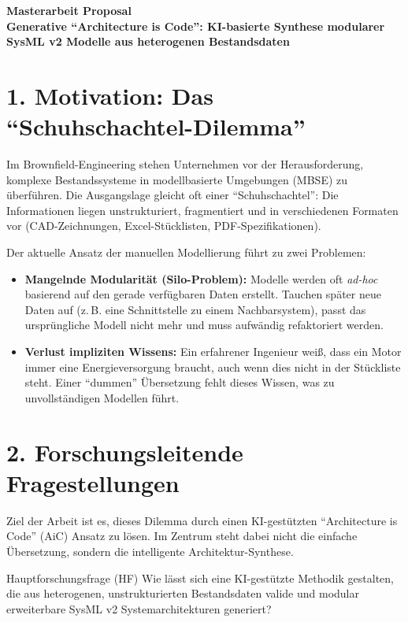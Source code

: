 \documentclass[a4paper,11pt]{article}
\begin{document}
\begin{center}
    {\LARGE \textbf{Masterarbeit Proposal}}\\[0.8em]
    {\Large \textbf{Generative \enquote{Architecture is Code}: KI-basierte Synthese modularer SysML v2 Modelle aus heterogenen Bestandsdaten}}\\[2em]
\end{center}

\section{1. Motivation: Das \enquote{Schuhschachtel-Dilemma}}

Im Brownfield-Engineering stehen Unternehmen vor der Herausforderung, komplexe Bestandssysteme in modellbasierte Umgebungen (MBSE) zu überführen. Die Ausgangslage gleicht oft einer \enquote{Schuhschachtel}: Die Informationen liegen unstrukturiert, fragmentiert und in verschiedenen Formaten vor (CAD-Zeichnungen, Excel-Stücklisten, PDF-Spezifikationen).

Der aktuelle Ansatz der manuellen Modellierung führt zu zwei Problemen:
\begin{itemize}
    \item \textbf{Mangelnde Modularität (Silo-Problem):} Modelle werden oft \textit{ad-hoc} basierend auf den gerade verfügbaren Daten erstellt. Tauchen später neue Daten auf (z.\,B. eine Schnittstelle zu einem Nachbarsystem), passt das ursprüngliche Modell nicht mehr und muss aufwändig refaktoriert werden.
    \item \textbf{Verlust impliziten Wissens:} Ein erfahrener Ingenieur weiß, dass ein Motor immer eine Energieversorgung braucht, auch wenn dies nicht in der Stückliste steht. Einer \enquote{dummen} Übersetzung fehlt dieses Wissen, was zu unvollständigen Modellen führt.
\end{itemize}

\section{2. Forschungsleitende Fragestellungen}

Ziel der Arbeit ist es, dieses Dilemma durch einen KI-gestützten \enquote{Architecture is Code} (AiC) Ansatz zu lösen. Im Zentrum steht dabei nicht die einfache Übersetzung, sondern die intelligente Architektur-Synthese.

\begin{researchbox}{Hauptforschungsfrage (HF)}
    Wie lässt sich eine KI-gestützte Methodik gestalten, die aus heterogenen, unstrukturierten Bestandsdaten valide und modular erweiterbare SysML v2 Systemarchitekturen generiert?
\end{researchbox}
\end{document}
